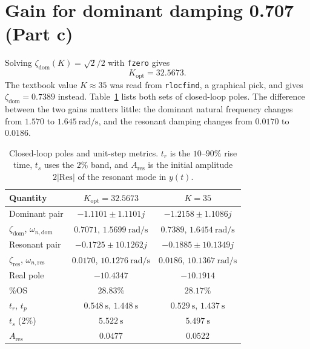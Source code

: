 \documentclass[12pt,a4paper]{article}
\begin{document}
\section{Gain for dominant damping 0.707 (Part c)}

Solving \(\zeta_{\mathrm{dom}}(K)=\sqrt2/2\) with \texttt{fzero} gives
\begin{equation}
  K_{\mathrm{opt}}=32.5673 .
  \label{eq:Kopt}
\end{equation}
The textbook value \(K\approx 35\) was read from \texttt{rlocfind}, a graphical pick, and gives \(\zeta_{\mathrm{dom}}=0.7389\) instead.
Table~\ref{tab:cl} lists both sets of closed-loop poles.
The difference between the two gains matters little: the dominant natural frequency changes from \(1.570\) to \(1.645~\mathrm{rad/s}\), and the resonant damping changes from \(0.0170\) to \(0.0186\).

\begin{table}[H]
  \centering
  \caption{Closed-loop poles and unit-step metrics. \(t_r\) is the \(10\)--\(90\%\) rise time, \(t_s\) uses the \(2\%\) band, and \(A_{\mathrm{res}}\) is the initial amplitude \(2|\mathrm{Res}|\) of the resonant mode in \(y(t)\).}
  \label{tab:cl}
  \small
  \begin{tabular}{lcc}
    \toprule
    Quantity & \(K_{\mathrm{opt}}=32.5673\) & \(K=35\) \\
    \midrule
    Dominant pair & \(-1.1101\pm1.1101j\) & \(-1.2158\pm1.1086j\) \\
    \(\zeta_{\mathrm{dom}}\), \(\omega_{n,\mathrm{dom}}\) & \(0.7071\), \(1.5699~\mathrm{rad/s}\) & \(0.7389\), \(1.6454~\mathrm{rad/s}\) \\
    Resonant pair & \(-0.1725\pm10.1262j\) & \(-0.1885\pm10.1349j\) \\
    \(\zeta_{\mathrm{res}}\), \(\omega_{n,\mathrm{res}}\) & \(0.0170\), \(10.1276~\mathrm{rad/s}\) & \(0.0186\), \(10.1367~\mathrm{rad/s}\) \\
    Real pole & \(-10.4347\) & \(-10.1914\) \\
    \midrule
    \%OS & \(28.83\%\) & \(28.17\%\) \\
    \(t_r\), \(t_p\) & \(0.548~\mathrm{s}\), \(1.448~\mathrm{s}\) & \(0.529~\mathrm{s}\), \(1.437~\mathrm{s}\) \\
    \(t_s\) (\(2\%\)) & \(5.522~\mathrm{s}\) & \(5.497~\mathrm{s}\) \\
    \(A_{\mathrm{res}}\) & \(0.0477\) & \(0.0522\) \\
    \bottomrule
  \end{tabular}
\end{table}
\end{document}
